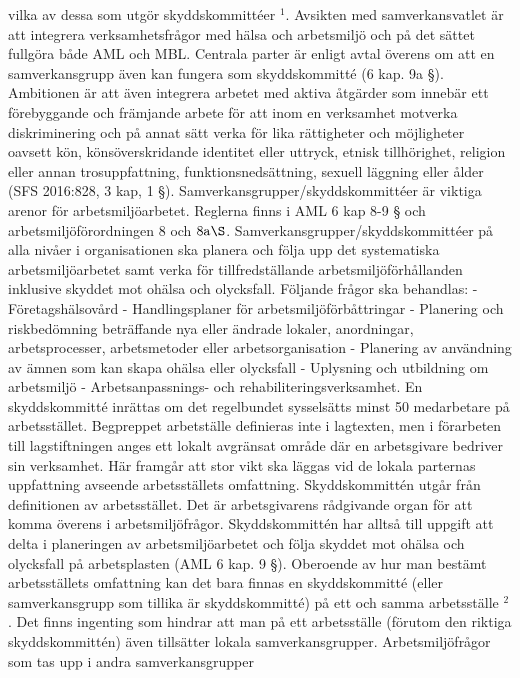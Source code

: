 vilka av dessa som utgör skyddskommittéer \({ }^{1}\). Avsikten med samverkansvatlet är att integrera verksamhetsfrågor med hälsa och arbetsmiljö och på det sättet fullgöra både AML och MBL. Centrala parter är enligt avtal överens om att en samverkansgrupp även kan fungera som skyddskommitté (6 kap. 9a §).
Ambitionen är att även integrera arbetet med aktiva åtgärder som innebär ett förebyggande och främjande arbete för att inom en verksamhet motverka diskriminering och på annat sätt verka för lika rättigheter och möjligheter oavsett kön, könsöverskridande identitet eller uttryck, etnisk tillhörighet, religion eller annan trosuppfattning, funktionsnedsättning, sexuell läggning eller ålder (SFS 2016:828, 3 kap, 1 §).
Samverkansgrupper/skyddskommittéer är viktiga arenor för arbetsmiljöarbetet. Reglerna finns i AML 6 kap 8-9 § och arbetsmiljöförordningen 8 och \(8 \mathrm{a} \S\).
Samverkansgrupper/skyddskommittéer på alla nivåer i organisationen ska planera och följa upp det systematiska arbetsmiljöarbetet samt verka för tillfredställande arbetsmiljöförhållanden inklusive skyddet mot ohälsa och olycksfall.
Följande frågor ska behandlas:
- Företagshälsovård
- Handlingsplaner för arbetsmiljöförbåttringar
- Planering och riskbedömning beträffande nya eller ändrade lokaler, anordningar, arbetsprocesser, arbetsmetoder eller arbetsorganisation
- Planering av användning av ämnen som kan skapa ohälsa eller olycksfall
- Uplysning och utbildning om arbetsmiljö
- Arbetsanpassnings- och rehabiliteringsverksamhet.
En skyddskommitté inrättas om det regelbundet sysselsätts minst 50 medarbetare på arbetsstället. Begpreppet arbetställe definieras inte i lagtexten, men i förarbeten till lagstiftningen anges ett lokalt avgränsat område där en arbetsgivare bedriver sin verksamhet. Här framgår att stor vikt ska läggas vid de lokala parternas uppfattning avseende arbetsställets omfattning.
Skyddskommittén utgår från definitionen av arbetsstället. Det är arbetsgivarens rådgivande organ för att komma överens i arbetsmiljöfrågor. Skyddskommittén har alltså till uppgift att delta i planeringen av arbetsmiljöarbetet och följa skyddet mot ohälsa och olycksfall på arbetsplasten (AML 6 kap. 9 §).
Oberoende av hur man bestämt arbetsställets omfattning kan det bara finnas en skyddskommitté (eller samverkansgrupp som tillika är skyddskommitté) på ett och samma arbetsställe \({ }^{2}\). Det finns ingenting som hindrar att man på ett arbetsställe (förutom den riktiga skyddskommittén) även tillsätter lokala samverkansgrupper. Arbetsmiljöfrågor som tas upp i andra samverkansgrupper

